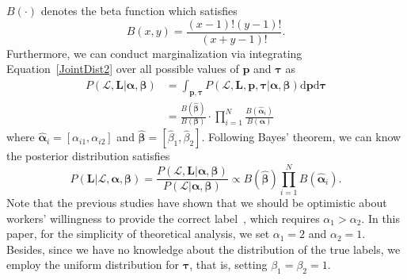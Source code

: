 \documentclass{article}
\begin{document}
$B(\cdot)$ denotes the beta function which satisfies
\begin{equation}
B(x,y)=\frac{(x-1)!(y-1)!}{(x+y-1)!}.
\end{equation}
Furthermore, we can conduct marginalization via integrating Equation~\ref{JointDist2} over all possible values of $\bm{p}$ and $\bm{\tau}$ as
\begin{equation}
\begin{split}
P(\mathcal{L},\bm{L}|\bm{\alpha}, \bm{\beta})&=\int_{\bm{p}, \bm{\tau}} P(\mathcal{L},\bm{L},\bm{p}, \bm{\tau}|\bm{\alpha}, \bm{\beta})\mathrm{d}\bm{p}\mathrm{d} \bm{\tau}\\
&=\frac{B(\hat{\bm{\beta}})}{B(\bm{\beta})}\cdot \prod_{i=1}^{N}\frac{B(\hat{\bm{\alpha}}_{i})}{B(\bm{\alpha})}
\end{split}
\end{equation}
where $\hat{\bm{\alpha}}_i=[\alpha_{i1},\alpha_{i2}]$ and $\hat{\bm{\beta}}=[\hat{\beta}_1,\hat{\beta}_2]$. Following Bayes' theorem, we can know the posterior distribution satisfies
\begin{equation}
\label{PostDist}
P(\bm{L}|\mathcal{L}, \bm{\alpha}, \bm{\beta})=\frac{P(\mathcal{L},\bm{L}|\bm{\alpha}, \bm{\beta})}{P(\mathcal{L}|\bm{\alpha}, \bm{\beta})}\propto B(\hat{\bm{\beta}})\prod_{i=1}^{N}B(\hat{\bm{\alpha}}_{i}). 
\end{equation}
Note that the previous studies have shown that we should be optimistic about workers' willingness to provide the correct label~\cite{chen2015statistical}, which requires $\alpha_1>\alpha_2$.
In this paper, for the simplicity of theoretical analysis, we set $\alpha_1=2$ and $\alpha_2=1$.
Besides, since we have no knowledge about the distribution of the true labels, we employ the uniform distribution for $\bm{\tau}$, that is, setting $\beta_1=\beta_2=1$.
\end{document}
